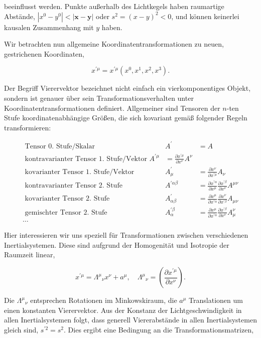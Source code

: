 \documentclass[10pt, letterpaper]{article}
\begin{document}
beeinflusst werden. Punkte außerhalb des Lichtkegels haben raumartige Abstände, $\left|x^{0}-y^{0}\right|<|\mathbf{x}-\mathbf{y}|$ oder $s^{2}=(x-y)^{2}<0$, und können keinerlei kausalen Zusammenhang mit $y$ haben.

Wir betrachten nun allgemeine Koordinatentransformationen zu neuen, gestrichenen Koordinaten,

$$
x^{\prime \mu}=x^{\prime \mu}\left(x^{0}, x^{1}, x^{2}, x^{3}\right) .
$$

Der Begriff Vierervektor bezeichnet nicht einfach ein vierkomponentiges Objekt, sondern ist genauer über sein Transformationsverhalten unter Koordinatentransformationen definiert. Allgemeiner sind Tensoren der $n$-ten Stufe koordinatenabhängige Größen, die sich kovariant gemäß folgender Regeln transformieren:

$$
\begin{array}{lrl}
\text { Tensor 0. Stufe/Skalar } & A^{\prime} & =A \\
\text { kontravarianter Tensor 1. Stufe/Vektor } A^{\prime \mu} & =\frac{\partial x^{\prime \mu}}{\partial x^{\nu}} A^{\nu} \\
\text { kovarianter Tensor 1. Stufe/Vektor } & A_{\mu}^{\prime} & =\frac{\partial x^{\nu}}{\partial x^{\prime \mu}} A_{\nu} \\
\text { kontravarianter Tensor 2. Stufe } & A^{\prime \alpha \beta} & =\frac{\partial x^{\prime \alpha}}{\partial x^{\mu}} \frac{\partial x^{\prime \beta}}{\partial x^{\nu}} A^{\mu \nu} \\
\text { kovarianter Tensor 2. Stufe } & A_{\alpha \beta}^{\prime} & =\frac{\partial x^{\mu}}{\partial x^{\prime \alpha}} \frac{\partial x^{\nu}}{\partial x^{\prime \beta}} A_{\mu \nu} \\
\text { gemischter Tensor 2. Stufe } & A_{\alpha}^{\prime \beta} & =\frac{\partial x^{\mu}}{\partial x^{\prime \alpha}} \frac{\partial x^{\prime \beta}}{\partial x^{\nu}} A_{\mu}^{\nu} \\
\ldots & &
\end{array}
$$

Hier interessieren wir uns speziell für Transformationen zwischen verschiedenen Inertialsystemen. Diese sind aufgrund der Homogenität und Isotropie der Raumzeit linear,

$$
x^{\prime \mu}=\Lambda^{\mu}{ }_{\nu} x^{\nu}+a^{\mu}, \quad \Lambda^{\mu}{ }_{\nu}=\left(\frac{\partial x^{\prime \mu}}{\partial x^{\nu}}\right) .
$$

Die $\Lambda^{\mu}{ }_{\nu}$ entsprechen Rotationen im Minkowskiraum, die $a^{\mu}$ Translationen um einen konstanten Vierervektor. Aus der Konstanz der Lichtgeschwindigkeit in allen Inertialsystemen folgt, dass generell Viererabstände in allen Inertialsystemen gleich sind, $s^{\prime 2}=s^{2}$. Dies ergibt eine Bedingung an die Transformationsmatrizen,
\end{document}
